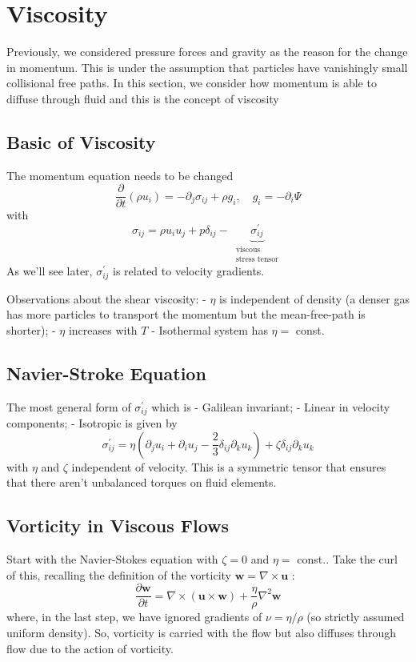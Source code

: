 \documentclass[12pt,a4paper]{article}
\begin{document}
\section{Viscosity}
Previously, we considered pressure forces and gravity as the reason for the change in momentum.
This is under the assumption that particles have vanishingly small collisional free paths.
In this section, we consider how momentum is able to diffuse through fluid and this is the concept of viscosity
\subsection{Basic of Viscosity}
The momentum equation needs to be changed
$$
\frac{\partial}{\partial t}\left(\rho u_i\right)=-\partial_j \sigma_{i j}+\rho g_i, \quad g_i=-\partial_i \Psi
$$
with
$$
\sigma_{i j}=\rho u_i u_j+p \delta_{i j}-\underbrace{\sigma_{i j}^{\prime}}_{\begin{array}{c}
\text { viscous } \\
\text { stress tensor }
\end{array}}
$$
As we'll see later, $\sigma_{i j}^{\prime}$ is related to velocity gradients.

Observations about the shear viscosity:
- $\eta$ is independent of density (a denser gas has more particles to transport the momentum but the mean-free-path is shorter);
- $\eta$ increases with $T$
- Isothermal system has $\eta=$ const.
\subsection{Navier-Stroke Equation}
The most general form of $\sigma_{i j}^{\prime}$ which is
- Galilean invariant;
- Linear in velocity components;
- Isotropic
is given by
$$
\sigma_{i j}^{\prime}=\eta\left(\partial_j u_i+\partial_i u_j-\frac{2}{3} \delta_{i j} \partial_k u_k\right)+\zeta \delta_{i j} \partial_k u_k
$$
with $\eta$ and $\zeta$ independent of velocity. This is a symmetric tensor that ensures that there aren't unbalanced torques on fluid elements.
\subsection{Vorticity in Viscous Flows}
Start with the Navier-Stokes equation with $\zeta=0$ and $\eta=$ const.. Take the curl of this, recalling the definition of the vorticity $\mathbf{w}=\nabla \times \mathbf{u}$ :
$$
\frac{\partial \mathbf{w}}{\partial t}=\nabla \times(\mathbf{u} \times \mathbf{w})+\frac{\eta}{\rho} \nabla^2 \mathbf{w}
$$
where, in the last step, we have ignored gradients of $\nu=\eta / \rho$ (so strictly assumed uniform density). So, vorticity is carried with the flow but also diffuses through flow due to the action of vorticity.
\end{document}
